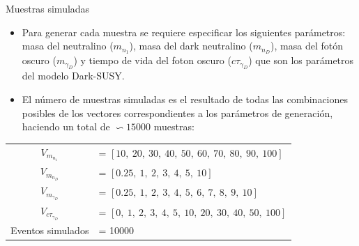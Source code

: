 \begin{frame}{Muestras simuladas}
    \begin{itemize}
        \item Para generar cada muestra se requiere especificar los siguientes parámetros: masa del neutralino ($m_{n_{1}}$), masa del dark neutralino ($m_{n_{D}}$), masa del fotón oscuro ($m_{\gamma_{D}}$) y tiempo de vida del foton oscuro ($c\tau_{\gamma_{D}}$) que son los parámetros del modelo Dark-SUSY. 
        \item El número de muestras simuladas es el resultado de todas las combinaciones posibles de los vectores correspondientes a los parámetros de generación, haciendo un total de $\backsim 15 000$ muestras:
    \end{itemize}

\begin{table}
\begin{footnotesize}
\begin{tabular}{|cl|}
\hline
$V_{m_{n_{1}}}$ & = $[10, ~20, ~30, ~40, ~50, ~60, ~70, ~80, ~90, ~100]$\\
$V_{m_{n_{D}}}$ & = $[0.25, ~1, ~2, ~3, ~4, ~5, ~10]$\\
$V_{m_{\gamma_{D}}}$ & = $[0.25, ~1, ~2, ~3, ~4, ~5, ~6, ~7, ~8, ~9, ~10]$\\
$V_{c\tau_{\gamma_{D}}}$ & = $[0, ~1, ~2, ~3, ~4, ~5, ~10, ~20, ~30, ~40, ~50, ~100]$\\
Eventos simulados &  = 10000\\
\hline
\hline
\end{tabular}
\end{footnotesize}
\end{table}

    

    

\end{frame}






